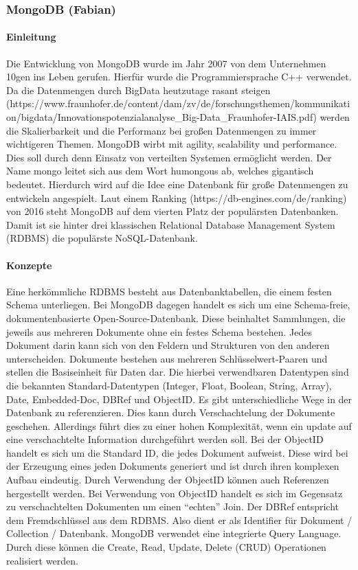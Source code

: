 \documentclass[]{article}
\begin{document}
\subsubsection{MongoDB (Fabian)}\label{mongodb-fabian}

\paragraph{Einleitung}\label{einleitung}

Die Entwicklung von MongoDB wurde im Jahr 2007 von dem Unternehmen 10gen
ins Leben gerufen. Hierfür wurde die Programmiersprache C++ verwendet.
Da die Datenmengen durch BigData heutzutage rasant steigen
(https://www.fraunhofer.de/content/dam/zv/de/forschungsthemen/kommunikation/bigdata/Innovationspotenzialanalyse\_Big-Data\_Fraunhofer-IAIS.pdf)
werden die Skalierbarkeit und die Performanz bei großen Datenmengen zu
immer wichtigeren Themen. MongoDB wirbt mit agility, scalability und
performance. Dies soll durch denn Einsatz von verteilten Systemen
ermöglicht werden. Der Name mongo leitet sich aus dem Wort humongous ab,
welches gigantisch bedeutet. Hierdurch wird auf die Idee eine Datenbank
für große Datenmengen zu entwickeln angespielt. Laut einem Ranking
(https://db-engines.com/de/ranking) von 2016 steht MongoDB auf dem
vierten Platz der populärsten Datenbanken. Damit ist sie hinter drei
klassischen Relational Database Management System (RDBMS) die populärste
NoSQL-Datenbank.

\paragraph{Konzepte}\label{konzepte}

Eine herkömmliche RDBMS besteht aus Datenbanktabellen, die einem festen
Schema unterliegen. Bei MongoDB dagegen handelt es sich um eine
Schema-freie, dokumentenbasierte Open-Source-Datenbank. Diese beinhaltet
Sammlungen, die jeweils aus mehreren Dokumente ohne ein festes Schema
bestehen. Jedes Dokument darin kann sich von den Feldern und Strukturen
von den anderen unterscheiden. Dokumente bestehen aus mehreren
Schlüsselwert-Paaren und stellen die Basiseinheit für Daten dar. Die
hierbei verwendbaren Datentypen sind die bekannten Standard-Datentypen
(Integer, Float, Boolean, String, Array), Date, Embedded-Doc, DBRef und
ObjectID. Es gibt unterschiedliche Wege in der Datenbank zu
referenzieren. Dies kann durch Verschachtelung der Dokumente geschehen.
Allerdings führt dies zu einer hohen Komplexität, wenn ein update auf
eine verschachtelte Information durchgeführt werden soll. Bei der
ObjectID handelt es sich um die Standard ID, die jedes Dokument
aufweist. Diese wird bei der Erzeugung eines jeden Dokuments generiert
und ist durch ihren komplexen Aufbau eindeutig. Durch Verwendung der
ObjectID können auch Referenzen hergestellt werden. Bei Verwendung von
ObjectID handelt es sich im Gegensatz zu verschachtelten Dokumenten um
einen ``echten'' Join. Der DBRef entspricht dem Fremdschlüssel aus dem
RDBMS. Also dient er als Identifier für Dokument / Collection /
Datenbank. MongoDB verwendet eine integrierte Query Language. Durch
diese können die Create, Read, Update, Delete (CRUD) Operationen
realisiert werden.
\end{document}
